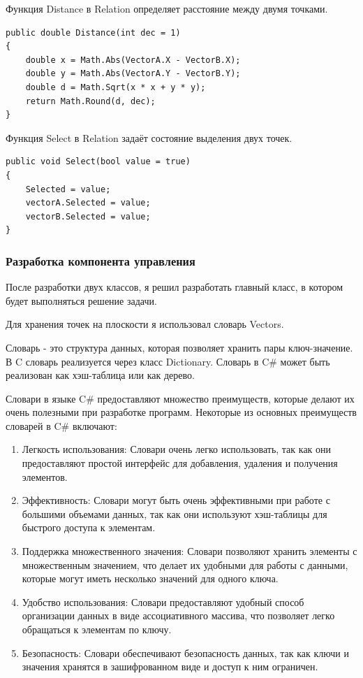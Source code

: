 \documentclass[a4paper,14pt, Times New Roman]{extarticle}
\begin{document}
Функция Distance в Relation определяет расстояние между двумя точками.

\begin{lstlisting}
public double Distance(int dec = 1)
{
    double x = Math.Abs(VectorA.X - VectorB.X);
    double y = Math.Abs(VectorA.Y - VectorB.Y);
    double d = Math.Sqrt(x * x + y * y);
    return Math.Round(d, dec);
}
\end{lstlisting}

Функция Select в Relation задаёт состояние выделения двух точек.

\begin{lstlisting}
public void Select(bool value = true)
{
    Selected = value;
    vectorA.Selected = value;
    vectorB.Selected = value;
}
\end{lstlisting}

\subsubsection{Разработка компонента управления}

После разработки двух классов, я решил разработать главный класс, в котором будет выполняться решение задачи.

Для хранения точек на плоскости я использовал словарь Vectors. 

Словарь - это структура данных, которая позволяет хранить пары ключ-значение. В C словарь реализуется через класс Dictionary. Словарь в C\# может быть реализован как хэш-таблица или как дерево.

Словари в языке C\# предоставляют множество преимуществ, которые делают их очень полезными при разработке программ. Некоторые из основных преимуществ словарей в C\# включают:

\begin{enumerate}
  \item Легкость использования: Словари очень легко использовать, так как они предоставляют простой интерфейс для добавления, удаления и получения элементов.
  \item Эффективность: Словари могут быть очень эффективными при работе с большими объемами данных, так как они используют хэш-таблицы для быстрого доступа к элементам.
  \item Поддержка множественного значения: Словари позволяют хранить элементы с множественным значением, что делает их удобными для работы с данными, которые могут иметь несколько значений для одного ключа.
  \item Удобство использования: Словари предоставляют удобный способ организации данных в виде ассоциативного массива, что позволяет легко обращаться к элементам по ключу.
  \item Безопасность: Словари обеспечивают безопасность данных, так как ключи и значения хранятся в зашифрованном виде и доступ к ним ограничен.
\end{enumerate}
\end{document}
